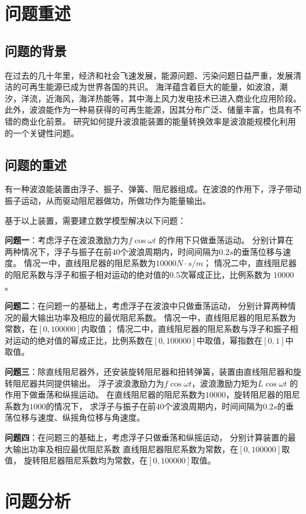 \documentclass[withoutpreface,bwprint]{cumcmthesis} %
\begin{document}
    \section{问题重述}
    \subsection{问题的背景}
    在过去的几十年里，经济和社会飞速发展，能源问题、污染问题日益严重，发展清洁的可再生能源已成为世界各国的共识。
    海洋蕴含着巨大的能量，如波浪，潮汐，洋流，近海风，海洋热能等，其中海上风力发电技术已进入商业化应用阶段。
    此外，波浪能作为一种易获得的可再生能源，因其分布广泛、储量丰富，也具有不错的商业化前景。
    研究如何提升波浪能装置的能量转换效率是波浪能规模化利用的一个关键性问题。
    \subsection{问题的重述}
    有一种波浪能装置由浮子、振子、弹簧、阻尼器组成。在波浪的作用下，浮子带动振子运动，从而驱动阻尼器做功，所做功作为能量输出。
    
    基于以上装置，需要建立数学模型解决以下问题：

    \textbf{问题一}：考虑浮子在波浪激励力为$f\cos\omega t$ 的作用下只做垂荡运动。
    分别计算在两种情况下，浮子与振子在前$40$个波浪周期内，时间间隔为$0.2s$的垂荡位移与速度。
    情况一中，直线阻尼器的阻尼系数为$10000N\cdot s/m$；
    情况二中，直线阻尼器的阻尼系数与浮子和振子相对运动的绝对值的$0.5$次幂成正比，比例系数为 $10000$。

    \textbf{问题二}：在问题一的基础上，考虑浮子在波浪中只做垂荡运动，
    分别计算两种情况的最大输出功率及相应的最优阻尼系数。
    情况一中，直线阻尼器的阻尼系数为常数，在$[0, 100000]$内取值；
    情况二中，直线阻尼器的阻尼系数与浮子和振子相对运动的绝对值的幂成正比，比例系数在$[0, 100000]$中取值，幂指数在$[0, 1]$中取值。

    \textbf{问题三}：除直线阻尼器外，还安装旋转阻尼器和扭转弹簧，装置由直线阻尼器和旋转阻尼器共同提供输出。
    浮子波浪激励力为$f\cos\omega t$，波浪激励力矩为$L\cos\omega t$ 的作用下做垂荡和纵摇运动。
    在直线阻尼器的阻尼系数为$10000$，旋转阻尼器的阻尼系数为$1000$的情况下，
    求浮子与振子在前$40$个波浪周期内，时间间隔为$0.2s$的垂荡位移与速度、纵摇角位移与角速度。

    \textbf{问题四}：在问题三的基础上，考虑浮子只做垂荡和纵摇运动，
    分别计算装置的最大输出功率及相应最优阻尼系数
    直线阻尼器阻尼系数为常数，在$[0, 100000]$取值，
    旋转阻尼器阻尼系数均为常数，在$[0, 100000]$取值。
    \section{问题分析}
\end{document}
